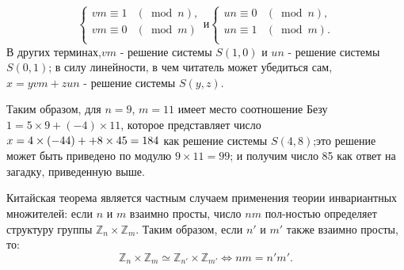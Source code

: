 $$ \left\{
\begin{array}{rcl}
vm \equiv 1&(\bmod{n}),\\
vm \equiv 0&(\bmod{m})\\
\end{array}
\right. и 
\left\{
\begin{array}{rcl}
un \equiv 0&(\bmod{n}),\\
un \equiv 1&(\bmod{m}).\\
\end{array}
\right.$$
В других терминах,$vm$ - решение системы $S(1,0)$ и $un$ - решение \linebreak системы $S(0,1)$; в силу линейности, в чем читатель может убедиться \linebreak сам, $x=yvm+zun$ - решение системы $S(y,z)$.
  
  Таким образом, для $n=9$, $m=11$ имеет место соотношение Безу \linebreak $1=5\times 9+(-4)\times 11$, которое представляет число $x=4\times (-44)+ \linebreak +8 \times 45=184$ как решение системы $S(4,8)$;это решение может быть \linebreak приведено по модулю $9 \times 11 = 99$; и получим число 85 как ответ на \linebreak загадку, приведенную выше.
  
  Китайская теорема является частным случаем применения теории \linebreak инвариантных множителей: если $n$ и $m$ взаимно просты, число $nm$ пол-\linebreak ностью определяет структуру группы $\mathbb{Z}_n \times \mathbb{Z}_m$. Таким образом, если $n'$ \linebreak и $m'$ также взаимно просты, то:
$$\mathbb{Z}_n \times \mathbb{Z}_m \simeq \mathbb{Z}_{n'} \times \mathbb{Z}_{m'} \Longleftrightarrow nm=n'm'.$$
  
